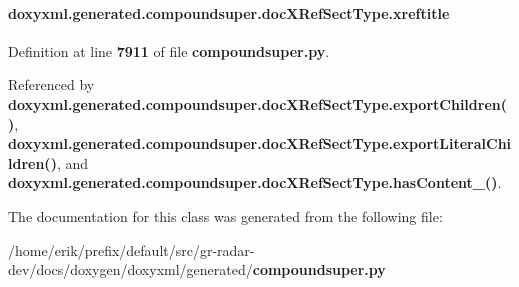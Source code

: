 \paragraph[{xreftitle}]{\setlength{\rightskip}{0pt plus 5cm}doxyxml.\+generated.\+compoundsuper.\+doc\+X\+Ref\+Sect\+Type.\+xreftitle}\label{classdoxyxml_1_1generated_1_1compoundsuper_1_1docXRefSectType_af2eb1dfec4e1af93d953c596229c83d5}


Definition at line {\bf 7911} of file {\bf compoundsuper.\+py}.



Referenced by {\bf doxyxml.\+generated.\+compoundsuper.\+doc\+X\+Ref\+Sect\+Type.\+export\+Children()}, {\bf doxyxml.\+generated.\+compoundsuper.\+doc\+X\+Ref\+Sect\+Type.\+export\+Literal\+Children()}, and {\bf doxyxml.\+generated.\+compoundsuper.\+doc\+X\+Ref\+Sect\+Type.\+has\+Content\+\_\+()}.



The documentation for this class was generated from the following file\+:\begin{DoxyCompactItemize}
\item 
/home/erik/prefix/default/src/gr-\/radar-\/dev/docs/doxygen/doxyxml/generated/{\bf compoundsuper.\+py}\end{DoxyCompactItemize}
